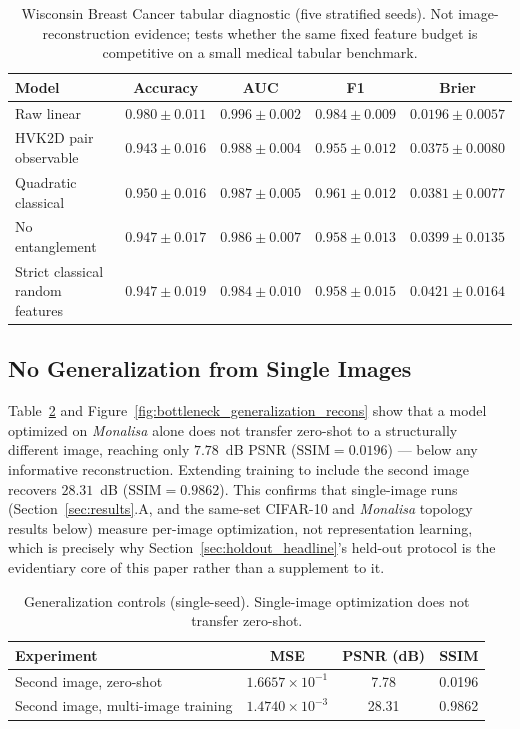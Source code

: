 \documentclass[journal]{IEEEtran}
\begin{document}
\begin{table}[t]
\centering
\caption{Wisconsin Breast Cancer tabular diagnostic (five stratified seeds). Not image-reconstruction evidence; tests whether the same fixed feature budget is competitive on a small medical tabular benchmark.}
\label{tab:wisconsin_diagnostic}
\scriptsize
\begin{tabular}{lcccc}
\toprule
Model & Accuracy & AUC & F1 & Brier \\
\midrule
Raw linear & $0.980{\pm}0.011$ & $0.996{\pm}0.002$ & $0.984{\pm}0.009$ & $0.0196{\pm}0.0057$ \\
HVK2D pair observable & $0.943{\pm}0.016$ & $0.988{\pm}0.004$ & $0.955{\pm}0.012$ & $0.0375{\pm}0.0080$ \\
Quadratic classical & $0.950{\pm}0.016$ & $0.987{\pm}0.005$ & $0.961{\pm}0.012$ & $0.0381{\pm}0.0077$ \\
No entanglement & $0.947{\pm}0.017$ & $0.986{\pm}0.007$ & $0.958{\pm}0.013$ & $0.0399{\pm}0.0135$ \\
Strict classical random features & $0.947{\pm}0.019$ & $0.984{\pm}0.010$ & $0.958{\pm}0.015$ & $0.0421{\pm}0.0164$ \\
\bottomrule
\end{tabular}
\end{table}

\subsection{No Generalization from Single Images}
Table~\ref{tab:generalization_controls} and Figure~\ref{fig:bottleneck_generalization_recons} show that a model optimized on \textit{Monalisa} alone does not transfer zero-shot to a structurally different image, reaching only $7.78$~dB PSNR ($\mathrm{SSIM}=0.0196$) --- below any informative reconstruction. Extending training to include the second image recovers $28.31$~dB ($\mathrm{SSIM}=0.9862$). This confirms that single-image runs (Section~\ref{sec:results}.A, and the same-set CIFAR-10 and \textit{Monalisa} topology results below) measure per-image optimization, not representation learning, which is precisely why Section~\ref{sec:holdout_headline}'s held-out protocol is the evidentiary core of this paper rather than a supplement to it.

\begin{table}[t]
\centering
\caption{Generalization controls (single-seed). Single-image optimization does not transfer zero-shot.}
\label{tab:generalization_controls}
\scriptsize
\begin{tabular}{lccc}
\toprule
Experiment & MSE & PSNR (dB) & SSIM \\
\midrule
Second image, zero-shot & $1.6657\times10^{-1}$ & 7.78 & 0.0196 \\
Second image, multi-image training & $1.4740\times10^{-3}$ & 28.31 & 0.9862 \\
\bottomrule
\end{tabular}
\end{table}
\end{document}
